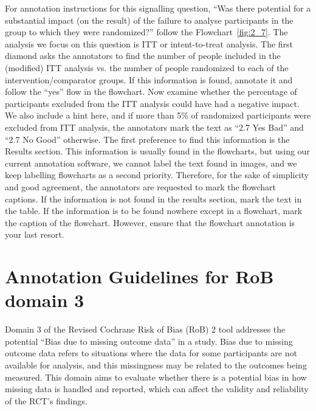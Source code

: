 \documentclass[sn-mathphys,Numbered]{sn-jnl}%
\begin{document}
For annotation instructions for this signalling question, ``Was there potential for a substantial impact (on the result) of the failure to analyse participants in the group to which they were randomized?'' follow the Flowchart~\ref{fig:2_7}.
The analysis we focus on this question is ITT or intent-to-treat analysis.
The first diamond asks the annotators to find the number of people included in the (modified) ITT analysis vs. the number of people randomized to each of the intervention/comparator groups. 
If this information is found, annotate it and follow the ``yes'' flow in the flowchart.
Now examine whether the percentage of participants excluded from the ITT analysis could have had a negative impact.
We also include a hint here, and if more than 5\% of randomized participants were excluded from ITT analysis, the annotators mark the text as ``2.7 Yes Bad'' and ``2.7 No Good'' otherwise.
The first preference to find this information is the Results section.
This information is usually found in the flowcharts, but using our current annotation software, we cannot label the text found in images, and we keep labelling flowcharts as a second priority. 
Therefore, for the sake of simplicity and good agreement, the annotators are requested to mark the flowchart captions.
If the information is not found in the results section, mark the text in the table.
If the information is to be found nowhere except in a flowchart, mark the caption of the flowchart.
However, ensure that the flowchart annotation is your last resort.
%
%
%
\section*{Annotation Guidelines for RoB domain 3}
\label{sec:dom3}
%
Domain 3 of the Revised Cochrane Risk of Bias (RoB) 2 tool addresses the potential ``Bias due to missing outcome data'' in a study.
Bias due to missing outcome data refers to situations where the data for some participants are not available for analysis, and this missingness may be related to the outcomes being measured.
This domain aims to evaluate whether there is a potential bias in how missing data is handled and reported, which can affect the validity and reliability of the RCT's findings.
%
%
%
\end{document}
